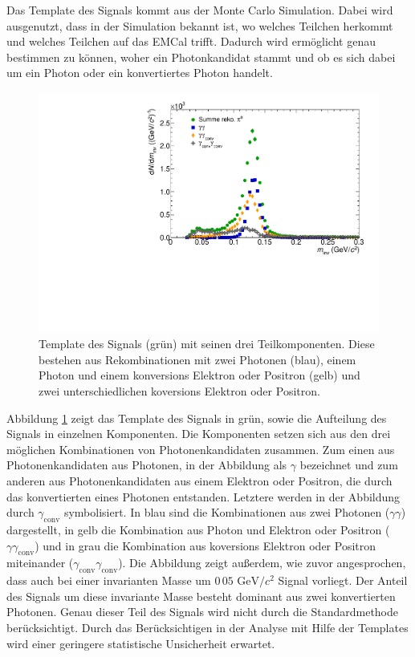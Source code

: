 Das Template des Signals kommt aus der Monte Carlo Simulation.
Dabei wird ausgenutzt, dass in der Simulation bekannt ist, wo welches Teilchen herkommt und welches Teilchen auf das EMCal trifft.
Dadurch wird ermöglicht genau bestimmen zu können, woher ein Photonkandidat stammt und ob es sich dabei um ein Photon oder ein konvertiertes Photon handelt.
\begin{figure}[tp]
\centering
\includegraphics[width=.75\linewidth]{PeakTemplateMotivation10_Data_2016.pdf}
\caption{Template des Signals (grün) mit seinen drei Teilkomponenten.
Diese bestehen aus Rekombinationen mit zwei Photonen (blau), einem Photon und einem konversions Elektron oder Positron (gelb) und zwei unterschiedlichen koversions Elektron oder Positron.}
\label{fig:SigTemp}
\end{figure}
\newline
Abbildung \ref{fig:SigTemp} zeigt das Template des Signals in grün, sowie die Aufteilung des Signals in einzelnen Komponenten.
Die Komponenten setzen sich aus den drei möglichen Kombinationen von Photonenkandidaten zusammen.
Zum einen aus Photonenkandidaten aus Photonen, in der Abbildung als $\gamma$ bezeichnet und zum anderen aus Photonenkandidaten aus einem Elektron oder Positron, die durch das konvertierten  eines Photonen entstanden.
Letztere werden in der Abbildung durch $\gamma_\text{conv}$ symbolisiert.
\newline
In blau sind die Kombinationen aus zwei Photonen ($\gamma\gamma$) dargestellt, in gelb die Kombination aus Photon und Elektron oder Positron ($\gamma\gamma_\text{conv}$) und in grau die Kombination aus koversions Elektron oder Positron miteinander ($\gamma_\text{conv}\gamma_\text{conv}$).
\newline
Die Abbildung zeigt außerdem, wie zuvor angesprochen, dass auch bei einer invarianten Masse um $0\,05 \text{ GeV}/c^{2}$ Signal vorliegt.
Der Anteil des Signals um diese invariante Masse besteht dominant aus zwei konvertierten Photonen.
Genau dieser Teil des Signals wird nicht durch die Standardmethode berücksichtigt.
Durch das Berücksichtigen in der Analyse mit Hilfe der Templates wird einer geringere statistische Unsicherheit erwartet.